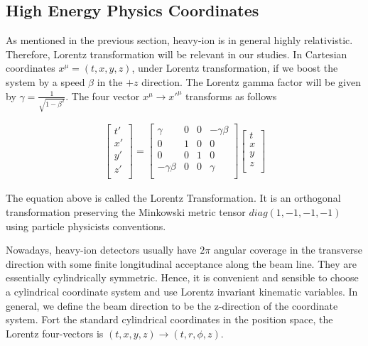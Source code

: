 \subsection{High Energy Physics Coordinates}

As mentioned in the previous section, heavy-ion is in general highly relativistic. Therefore, Lorentz transformation will be relevant in our studies. In Cartesian coordinates $x^\mu = (t,x,y,z)$, under Lorentz transformation, if we boost the system by a speed $\beta$ in the $+z$ direction. The Lorentz gamma factor will be given by $\gamma = \frac{1}{\sqrt{1 - \beta^2}}$. The four vector $x^\mu \rightarrow x'^\mu$ transforms as follows

\begin{align}
   \begin{bmatrix} 
           t' \\
           x' \\
           y' \\
           z' \\
         \end{bmatrix} =
             \begin{bmatrix} 
             \gamma  & 0  & 0 & - \gamma \beta \\ 
            0 & 1 & 0 & 0 \\ 
             0 & 0 & 1 & 0 \\
             - \gamma  \beta & 0 & 0 &  \gamma \\
	\end{bmatrix} 
	  \begin{bmatrix} 
           t \\
           x \\
           y \\
           z \\
	\end{bmatrix}
\end{align}

The equation above is called the Lorentz Transformation. It is an orthogonal transformation preserving the Minkowski metric tensor $diag(1,-1,-1,-1)$ using particle physicists conventions.


Nowadays, heavy-ion detectors usually have $2\pi$ angular coverage in the transverse direction with some finite longitudinal acceptance along the beam line. They are essentially cylindrically symmetric. Hence, it is convenient and sensible to choose a cylindrical coordinate system and use Lorentz invariant kinematic variables. In general, we define the beam direction to be the z-direction of the coordinate system. Fort the standard cylindrical coordinates in the position space, the Lorentz four-vectors is $(t,x,y,z) \rightarrow (t, r, \phi, z)$. 



